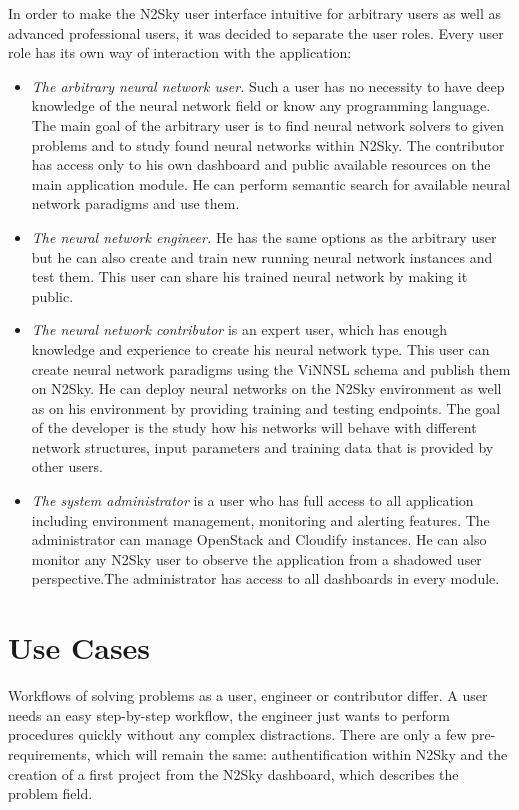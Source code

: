 \documentclass[conference]{IEEEtran}
\begin{document}
In order to make the N2Sky user interface intuitive for arbitrary users as well as advanced professional users, it was decided to separate the user roles. Every user role has its own way of interaction with the application:
\begin{itemize}
\item \emph{The arbitrary neural network user.} Such a user has no necessity to have deep knowledge of the neural network field or know any programming language. The main goal of the arbitrary user is to find neural network solvers to given problems and to study found neural networks within N2Sky. The contributor has access only to his own dashboard and public available resources on the main application module. He can perform semantic search for available neural network paradigms and use them.
\item \emph{The neural network engineer.} He has the same options as the arbitrary user but he can also create and train new running neural network instances and test them. This user can share his trained neural network by making it public.
\item \emph{The neural network contributor} is an expert user, which has enough knowledge and experience to create his neural network type. This user can create neural network paradigms using the ViNNSL schema and publish them on N2Sky. He can deploy neural networks on the N2Sky environment as well as on his environment by providing training and testing endpoints. The goal of the developer is the study how his networks will behave with different network structures, input parameters and training data that is provided by other users.
\item \emph{The system administrator} is a user who has full access to all application including environment management, monitoring and alerting features. The administrator can manage OpenStack and Cloudify instances. He can also monitor any N2Sky user to observe the application from a shadowed user perspective.The administrator has access to all dashboards in every module.
\end{itemize}


\section{Use Cases}
\label{sec:usecases}

Workflows of solving problems as a user, engineer or contributor differ. A user needs an easy step-by-step workflow, the engineer just wants to perform procedures quickly without any complex distractions. There are only a few pre-requirements, which will remain the same: authentification within N2Sky and the creation of a first project from the N2Sky dashboard, which describes the problem field.
\end{document}
